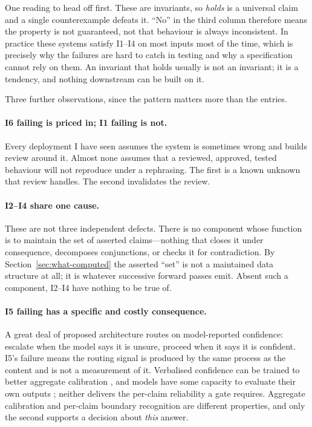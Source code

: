 \documentclass[11pt]{article}
\theoremstyle{plain}
\theoremstyle{definition}
\begin{document}
One reading to head off first. These are invariants, so \emph{holds} is a universal
claim and a single counterexample defeats it. ``No'' in the third column therefore
means the property is not guaranteed, not that behaviour is always inconsistent. In
practice these systems satisfy I1--I4 on most inputs most of the time, which is
precisely why the failures are hard to catch in testing and why a specification cannot
rely on them. An invariant that holds usually is not an invariant; it is a tendency,
and nothing downstream can be built on it.

Three further observations, since the pattern matters more than the entries.

\paragraph{I6 failing is priced in; I1 failing is not.} Every deployment I have
seen assumes the system is sometimes wrong and builds review around it. Almost none
assumes that a reviewed, approved, tested behaviour will not reproduce under a
rephrasing. The first is a known unknown that review handles. The second
invalidates the review.

\paragraph{I2--I4 share one cause.} These are not three independent defects. There
is no component whose function is to maintain the set of asserted claims---nothing
that closes it under consequence, decomposes conjunctions, or checks it for
contradiction. By Section~\ref{sec:what-computed} the asserted ``set'' is not a
maintained data structure at all; it is whatever successive forward passes emit.
Absent such a component, I2--I4 have nothing to be true of.

\paragraph{I5 failing has a specific and costly consequence.} A great deal of
proposed architecture routes on model-reported confidence: escalate when the model
says it is unsure, proceed when it says it is confident. I5's failure means the
routing signal is produced by the same process as the content and is not a
measurement of it. Verbalised confidence can be trained to better aggregate
calibration \citep{lin2022}, and models have some capacity to evaluate their own
outputs \citep{kadavath2022}; neither delivers the per-claim reliability a gate
requires. Aggregate calibration and per-claim boundary recognition are different
properties, and only the second supports a decision about \emph{this} answer.
\end{document}
